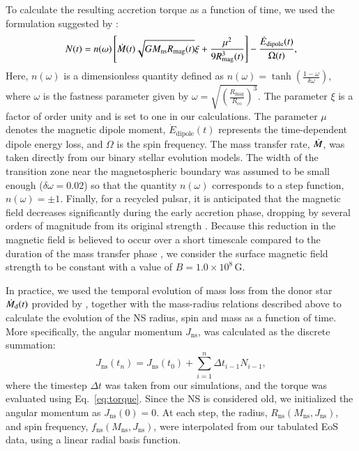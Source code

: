 \documentclass[main.tex]{subfiles}
\begin{document}
        To calculate the resulting accretion torque as a function of time, we used the formulation suggested by \cite{Tauris:sc2012}:
        \begin{equation}
            \label{eq:torque}
            N(t) = n(\omega) \left[\dot{M}(t) \sqrt{GM_\mathrm{ns}R_\mathrm{mag}(t)}\xi + \frac{\mu^2}{9R^3_\mathrm{mag}(t)}\right] - \frac{\dot{E}_\mathrm{dipole}(t)}{\Omega(t)},
        \end{equation}
        Here, $n(\omega)$ is a dimensionless quantity defined as $n(\omega) = \tanh \left( \frac{1 - \omega}{\delta \omega} \right)$, where $\omega$ is the fastness parameter given by $\omega = \sqrt{\left( \frac{R_\mathrm{mag}}{R_\mathrm{co}} \right)^3}$. The parameter $\xi$ is a factor of order unity and is set to one in our calculations. The parameter $\mu$ denotes the magnetic dipole moment, $\dot{E}_\mathrm{dipole}(t)$ represents the time-dependent dipole energy loss, and $\Omega$ is the spin frequency.
        The mass transfer rate, $\dot{M}$, was taken directly from our \mesa binary stellar evolution models. The width of the transition zone near the magnetospheric boundary was assumed to be small enough ($\delta \omega = 0.02$) so that the quantity $n(\omega)$ corresponds to a step function, $n(\omega) = \pm 1$.
        Finally, for a recycled pulsar, it is anticipated that the magnetic field decreases significantly during the early accretion phase, dropping by several orders of magnitude from its original strength \citep{1989Natur.342..656S}.
        Because this reduction in the magnetic field is believed to occur over a short timescale compared to the duration of the mass transfer phase \citep{Bhattacharya:1991pre, 2017ApJ...835....4B}, we consider the surface magnetic field strength to be  constant with a value of $B = 1.0 \times 10^8\,\mathrm{G}$. 
        
        
        In practice, we used the temporal evolution of mass loss from the donor star $\dot{M}_{\rm d}(t)$ provided by \mesa, together with the mass-radius relations described above to calculate the evolution of the NS radius, spin and mass as a function of time. 
        More specifically, the angular momentum $J_\mathrm{ns}$, was calculated as the discrete summation: 
        \begin{equation}\label{eq:j_numerical_integration}
            J_\mathrm{ns}(t_n) = J_\mathrm{ns}(t_0) + \sum_{i=1}^n \Delta t_{i-1} N_{i-1},
        \end{equation}
        where the timestep $\Delta t$ was taken from our \mesa simulations, and the torque was evaluated using Eq.~\eqref{eq:torque}. Since the NS is considered old, we initialized the angular momentum as $J_\mathrm{ns}(0) = 0$.
         At each step, the radius, $R_\mathrm{ns}(M_\mathrm{ns}, J_\mathrm{ns})$, and spin frequency, $f_\mathrm{ns}(M_\mathrm{ns}, J_\mathrm{ns})$, were interpolated from our tabulated EoS data, using a linear radial basis function. 
        
\end{document}

